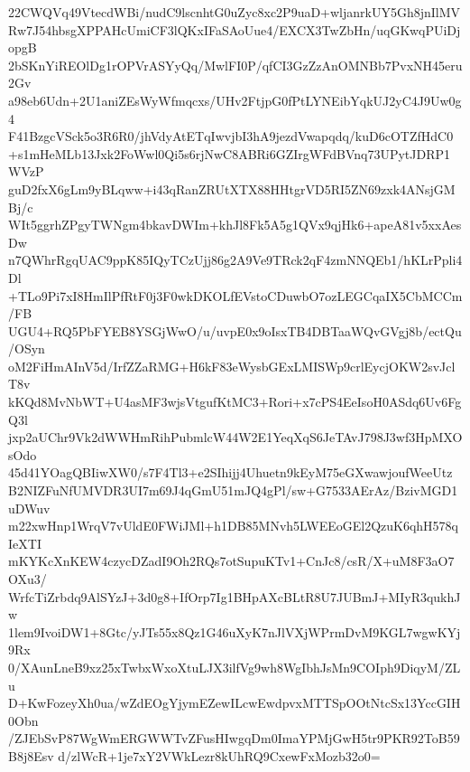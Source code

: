 22CWQVq49VtecdWBi/nudC9lscnhtG0uZyc8xc2P9uaD+wljanrkUY5Gh8jnIlMV
Rw7J54hbsgXPPAHcUmiCF3lQKxIFaSAoUue4/EXCX3TwZbHn/uqGKwqPUiDjopgB
2bSKnYiREOlDg1rOPVrASYyQq/MwlFI0P/qfCI3GzZzAnOMNBb7PvxNH45eru2Gv
a98eb6Udn+2U1aniZEsWyWfmqcxs/UHv2FtjpG0fPtLYNEibYqkUJ2yC4J9Uw0g4
F41BzgcVSck5o3R6R0/jhVdyAtETqIwvjbI3hA9jezdVwapqdq/kuD6cOTZfHdC0
+s1mHeMLb13Jxk2FoWwl0Qi5s6rjNwC8ABRi6GZIrgWFdBVnq73UPytJDRP1WVzP
guD2fxX6gLm9yBLqww+i43qRanZRUtXTX88HHtgrVD5RI5ZN69zxk4ANsjGMBj/c
WIt5ggrhZPgyTWNgm4bkavDWIm+khJl8Fk5A5g1QVx9qjHk6+apeA81v5xxAesDw
n7QWhrRgqUAC9ppK85IQyTCzUjj86g2A9Ve9TRck2qF4zmNNQEb1/hKLrPpli4Dl
+TLo9Pi7xI8HmIlPfRtF0j3F0wkDKOLfEVstoCDuwbO7ozLEGCqaIX5CbMCCm/FB
UGU4+RQ5PbFYEB8YSGjWwO/u/uvpE0x9oIsxTB4DBTaaWQvGVgj8b/ectQu/OSyn
oM2FiHmAInV5d/IrfZZaRMG+H6kF83eWysbGExLMISWp9crlEycjOKW2svJclT8v
kKQd8MvNbWT+U4asMF3wjsVtgufKtMC3+Rori+x7cPS4EeIsoH0ASdq6Uv6FgQ3l
jxp2aUChr9Vk2dWWHmRihPubmlcW44W2E1YeqXqS6JeTAvJ798J3wf3HpMXOsOdo
45d41YOagQBIiwXW0/s7F4Tl3+e2SIhijj4Uhuetn9kEyM75eGXwawjoufWeeUtz
B2NIZFuNfUMVDR3UI7m69J4qGmU51mJQ4gPl/sw+G7533AErAz/BzivMGD1uDWuv
m22xwHnp1WrqV7vUldE0FWiJMl+h1DB85MNvh5LWEEoGEl2QzuK6qhH578qIeXTI
mKYKcXnKEW4czycDZadI9Oh2RQs7otSupuKTv1+CnJc8/csR/X+uM8F3aO7OXu3/
WrfcTiZrbdq9AlSYzJ+3d0g8+IfOrp7Ig1BHpAXcBLtR8U7JUBmJ+MIyR3qukhJw
1lem9IvoiDW1+8Gtc/yJTs55x8Qz1G46uXyK7nJlVXjWPrmDvM9KGL7wgwKYj9Rx
0/XAunLneB9xz25xTwbxWxoXtuLJX3ilfVg9wh8WgIbhJsMn9COIph9DiqyM/ZLu
D+KwFozeyXh0ua/wZdEOgYjymEZewILcwEwdpvxMTTSpOOtNtcSx13YccGIH0Obn
/ZJEbSvP87WgWmERGWWTvZFusHIwgqDm0ImaYPMjGwH5tr9PKR92ToB59B8j8Esv
d/zlWcR+1je7xY2VWkLezr8kUhRQ9CxewFxMozb32o0=
